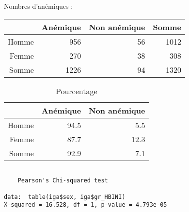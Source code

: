 \documentclass[11pt,a4paper]{article}\usepackage[]{graphicx}\usepackage[]{color}
\makeatletter
\newenvironment{kframe}{%
 \def\at@end@of@kframe{}%
 \ifinner\ifhmode%
  \def\at@end@of@kframe{\end{minipage}}%
  \begin{minipage}{\columnwidth}%
 \fi\fi%
 \def\FrameCommand##1{\hskip\@totalleftmargin \hskip-\fboxsep
 \colorbox{shadecolor}{##1}\hskip-\fboxsep
     \hskip-\linewidth \hskip-\@totalleftmargin \hskip\columnwidth}%
 \MakeFramed {\advance\hsize-\width
   \@totalleftmargin\z@ \linewidth\hsize
   \@setminipage}}%
 {\par\unskip\endMakeFramed%
 \at@end@of@kframe}
\newenvironment{knitrout}{}{} %
\makeatother
\begin{document}
Nombres d'anémiques :

\begin{table}[ht]
\centering
\begin{tabular}{rrrr}
  \hline
 & Anémique & Non anémique & Somme \\ 
  \hline
Homme & 956 & 56 & 1012 \\ 
  Femme & 270 & 38 & 308 \\ 
  Somme & 1226 & 94 & 1320 \\ 
   \hline
\end{tabular}
\end{table}
\begin{table}[ht]
\centering
\begin{tabular}{rrr}
  \hline
 & Anémique & Non anémique \\ 
  \hline
Homme & 94.5 & 5.5 \\ 
  Femme & 87.7 & 12.3 \\ 
  Somme & 92.9 & 7.1 \\ 
   \hline
\end{tabular}
\caption{Pourcentage} 
\end{table}


\begin{knitrout}
\color{fgcolor}\begin{kframe}
\begin{verbatim}

	Pearson's Chi-squared test

data:  table(iga$sex, iga$gr_HBINI)
X-squared = 16.528, df = 1, p-value = 4.793e-05
\end{verbatim}
\end{kframe}
\end{knitrout}
\end{document}
